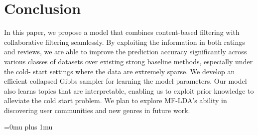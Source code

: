 \documentclass[10pt,conference]{IEEEtran}
\begin{document}
\section{Conclusion}
In this paper, we propose a model that combines content-based filtering with collaborative filtering seamlessly. By exploiting the information in both ratings and reviews, we are able to improve the prediction accuracy significantly across various classes of datasets over existing strong baseline methods, especially under the cold- start settings where the data are extremely sparse. We develop an efficient collapsed Gibbs sampler for learning the model parameters. Our model also learns topics that are interpretable, enabling us to exploit prior knowledge to alleviate the cold start problem. We plan to explore MF-LDA’s ability in discovering user communities and new genres in future work.



\nocite{Chen2015}
\nocite{Qiu2016}
\nocite{He2016}
\nocite{Mcauley2013}
\nocite{Pang2006}
\nocite{Cheng2018}
\nocite{Ling2014}
\nocite{Ganu2009}
\nocite{Heng2018}

\newpage
\Urlmuskip=0mu plus 1mu\relax



\end{document}
